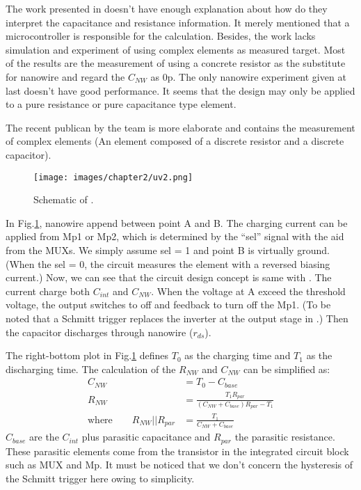 The work presented in \cite{Juv1} doesn't have enough explanation about how do they interpret the capacitance and resistance information.
It merely mentioned that a microcontroller is responsible for the calculation.
Besides, the work lacks simulation and experiment of using complex elements as measured target.
Most of the results are the measurement of using a concrete resistor as the substitute for nanowire and regard the $C_{NW}$ as 0p.
The only nanowire experiment given at last doesn't have good performance.
It seems that the design may only be applied to a pure resistance or pure capacitance type element.


The recent publican \cite{Juv2} by the team is more elaborate and contains the measurement of complex elements (An element composed of a discrete resistor and a discrete capacitor).
\begin{figure}[!htbp]
    \centering
    \texttt{[image: images/chapter2/uv2.png]}
    \caption{Schematic of \cite{Juv2}.}
    \label{fig:tot2}
\end{figure}

In Fig.\ref{fig:tot2}, nanowire append between point A and B.
The charging current can be applied from Mp1 or Mp2, which is determined by the ``sel'' signal with the aid from the MUXs.
We simply assume sel = 1 and point B is virtually ground.
(When the sel = 0, the circuit measures the element with a reversed biasing current.)
Now, we can see that the circuit design concept is same with \cite{Juv1}.
The current charge both $C_{int}$ and $C_{NW}$.
When the voltage at A exceed the threshold voltage, the output switches to off and feedback to turn off the Mp1.
(To be noted that a Schmitt trigger replaces the inverter at the output stage in \cite{Juv1}.)
Then the capacitor discharges through nanowire ($r_{ds}$).

The right-bottom plot in Fig.\ref{fig:tot2} defines $T_0$ as the charging time and $T_1$ as the discharging time.
The calculation of the $R_{NW}$ and $C_{NW}$  can be simplified as:
\setlength{\mathindent}{2cm}
\begin{align}
                         C_{NW}            & = T_0 - C_{base}\\
                         R_{NW}            & = \frac{T_1R_{par}}{(C_{NW} + C_{base})R_{par} - T_1}\\
    \text{where} \qquad  R_{NW} || R_{par} & = \frac{T_1}{C_{NW} + C_{base}}
\end{align}
$C_{base}$ are the $C_{int}$ plus parasitic capacitance and $R_{par}$ the parasitic resistance.
These parasitic elements come from the transistor in the integrated circuit block such as MUX and Mp.
It must be noticed that we don't concern the hysteresis of the Schmitt trigger here owing to simplicity.


